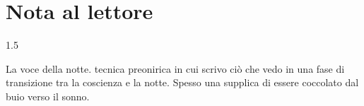 \chapter*{Nota al lettore}

\begin{spacing}{1.5}

La voce della notte. tecnica preonirica in cui scrivo ciò che vedo in una fase di transizione tra la coscienza e la notte. Spesso una supplica di essere coccolato dal buio verso il sonno.

\end{spacing}
